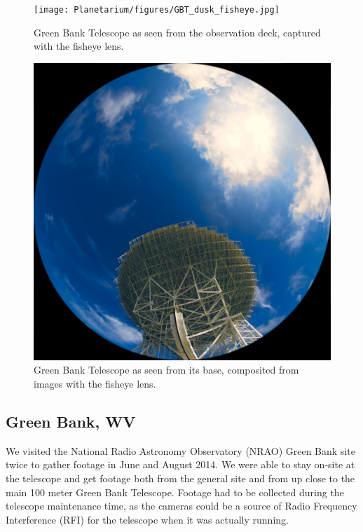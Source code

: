 \begin{figure}[htb]
\centering
\begin{minipage}[b]{0.51\textwidth}
\centering
\texttt{[image: Planetarium/figures/GBT\_dusk\_fisheye.jpg]}
\caption{Green Bank Telescope as seen from the observation deck, captured with the fisheye lens.}
\label{Fig:GBT_dusk_fisheye}
\end{minipage}%
\begin{minipage}[b]{0.02\textwidth}
\hspace{1cm}
\end{minipage}%
\begin{minipage}[b]{0.43\textwidth}
\centering
\includegraphics[width=0.95\linewidth]{Planetarium/figures/GBT_base_render.jpg}
\caption{Green Bank Telescope as seen from its base, composited from images with the fisheye lens.}
\label{Fig:GBT_base_fisheye}
\end{minipage}
\end{figure}

\subsection{Green Bank, WV}
We visited the National Radio Astronomy Observatory (NRAO) Green Bank site twice to gather footage in June and August 2014. We were able to stay on-site at the telescope and get footage both from the general site and from up close to the main 100 meter Green Bank Telescope. Footage had to be collected during the telescope maintenance time, as the cameras could be a source of Radio Frequency Interference (RFI) for the telescope when it was actually running.

